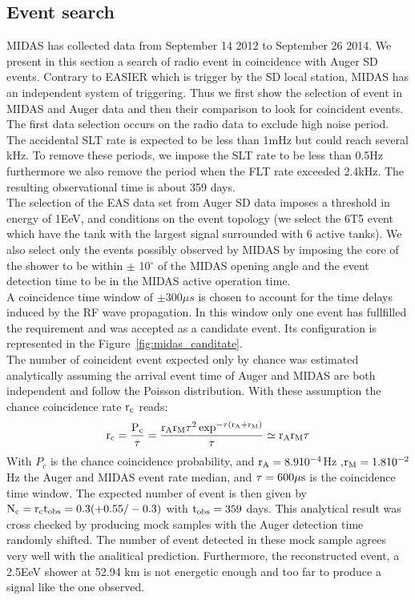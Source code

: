 \documentclass{PoS}
\begin{document}
\subsection{Event search}
MIDAS has collected data from September 14 2012 to September 26 2014. We present in this section a search of radio event in coincidence with Auger SD events. Contrary to EASIER which is trigger by the SD local station, MIDAS has an independent system of triggering. Thus we first show the selection of event in MIDAS and Auger data and then their comparison to look for coincident events. The first data selection occurs on the radio data to exclude high noise period. The accidental SLT rate is expected to be less than 1mHz but could reach several kHz. To remove these periods, we impose the SLT rate to be less than 0.5Hz furthermore we also remove the period when the FLT rate exceeded 2.4kHz. The resulting observational time is about 359 days. \\The selection of the EAS data set from Auger SD data imposes a threshold in energy of 1EeV, and conditions on the event topology (we select the 6T5 event which have the tank with the largest signal surrounded with 6 active tanks). We also select only the events possibly observed by MIDAS by imposing the core of the shower to be within $\pm$ 10$^{\circ}$ of the MIDAS opening angle and the event detection time to be in the MIDAS active operation time.\\A coincidence time window of $\pm 300 \mu s$ is chosen to account for the time delays induced by the RF wave propagation.  
In this window only one event has fullfilled the
requirement and was accepted as a candidate event. Its configuration is represented in the Figure~\ref{fig:midas_canditate}. \\The number of coincident event expected only by chance was estimated analytically assuming the arrival event time of Auger and MIDAS are both independent and follow the Poisson distribution. With these assumption the chance coincidence rate $\rm r_c$ reads:
\begin{equation}
\rm r_c = \frac{P_c}{\tau} = \frac{r_{A}r_{M}\tau^2 \exp^{-\tau (r_A + r_M)}}{\tau} \simeq r_{A}r_{M}\tau
\end{equation}
With $P_c$ is the chance coincidence probability, and $\rm r_A = 8.9 10^{-4} $Hz ,$\rm r_M = 1.8 10^{-2} $ Hz the Auger and MIDAS event rate median, and $\rm \tau = 600 \mu s$ is the coincidence time window. The expected number of event is then given by $\rm N_c = r_c t_{obs} = 0.3 (+0.55/-0.3) $ with $\rm t_{obs} = 359 $ days. This analytical result was cross checked by producing mock samples with the Auger detection time randomly shifted. The  number of event detected in these mock sample agrees very well with the analitical prediction.
Furthermore, the reconstructed event, a 2.5EeV shower at 52.94 km is not energetic enough and too far to produce a signal like the one observed.
\end{document}
